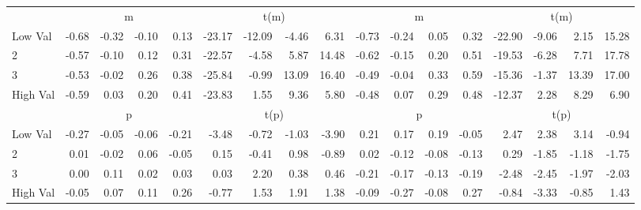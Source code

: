 \begin{table}[!ht]
\begin{tabular}{lrrrrrrrrrrrrrrrr}
  
    
      & \multicolumn{4}{c}{m} & \multicolumn{4}{c}{t(m)}
    
      & \multicolumn{4}{c}{m} & \multicolumn{4}{c}{t(m)}
    
    \\
      \cmidrule(r){2-5} \cmidrule(r){6-9} \cmidrule(r){10-13} \cmidrule(r){14-17}

    Low Val   & -0.68  & -0.32  & -0.10  & 0.13  & -23.17  & -12.09  & -4.46  & 6.31  & -0.73  & -0.24  & 0.05  & 0.32  & -22.90  & -9.06  & 2.15  & 15.28  \\
           2  & -0.57  & -0.10  & 0.12  & 0.31  & -22.57  & -4.58  & 5.87  & 14.48  & -0.62  & -0.15  & 0.20  & 0.51  & -19.53  & -6.28  & 7.71  & 17.78  \\
           3  & -0.53  & -0.02  & 0.26  & 0.38  & -25.84  & -0.99  & 13.09  & 16.40  & -0.49  & -0.04  & 0.33  & 0.59  & -15.36  & -1.37  & 13.39  & 17.00  \\
    High Val  & -0.59  & 0.03  & 0.20  & 0.41  & -23.83  & 1.55  & 9.36  & 5.80  & -0.48  & 0.07  & 0.29  & 0.48  & -12.37  & 2.28  & 8.29  & 6.90  \\

  
    
      & \multicolumn{4}{c}{p} & \multicolumn{4}{c}{t(p)}
    
      & \multicolumn{4}{c}{p} & \multicolumn{4}{c}{t(p)}
    
    \\
      \cmidrule(r){2-5} \cmidrule(r){6-9} \cmidrule(r){10-13} \cmidrule(r){14-17}

    Low Val   & -0.27  & -0.05  & -0.06  & -0.21  & -3.48  & -0.72  & -1.03  & -3.90  & 0.21  & 0.17  & 0.19  & -0.05  & 2.47  & 2.38  & 3.14  & -0.94  \\
           2  & 0.01  & -0.02  & 0.06  & -0.05  & 0.15  & -0.41  & 0.98  & -0.89  & 0.02  & -0.12  & -0.08  & -0.13  & 0.29  & -1.85  & -1.18  & -1.75  \\
           3  & 0.00  & 0.11  & 0.02  & 0.03  & 0.03  & 2.20  & 0.38  & 0.46  & -0.21  & -0.17  & -0.13  & -0.19  & -2.48  & -2.45  & -1.97  & -2.03  \\
    High Val  & -0.05  & 0.07  & 0.11  & 0.26  & -0.77  & 1.53  & 1.91  & 1.38  & -0.09  & -0.27  & -0.08  & 0.27  & -0.84  & -3.33  & -0.85  & 1.43  \\

  

  \bottomrule
\end{tabular}
\label{tbl:32_Size_BM_Prior_B2016}
\end{table}